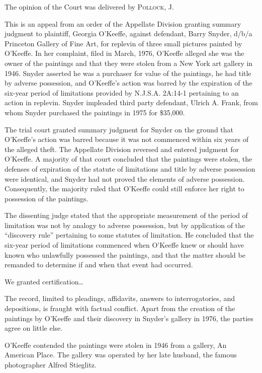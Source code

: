 
\opinion The opinion of the Court was delivered by \textsc{Pollock}, J.

This is an appeal from an order of the Appellate Division granting summary
judgment to plaintiff, Georgia O'Keeffe, against defendant, Barry Snyder, d/b/a
Princeton Gallery of Fine Art, for replevin of three small pictures painted by
O'Keeffe. In her complaint, filed in March, 1976, O'Keeffe alleged she was the
owner of the paintings and that they were stolen from a New York art gallery in
1946. Snyder asserted he was a purchaser for value of the paintings, he had
title by adverse possession, and O'Keeffe's action was barred by the expiration
of the six-year period of limitations provided by N.J.S.A. 2A:14-1 pertaining
to an action in replevin. Snyder impleaded third party defendant, Ulrich A.
Frank, from whom Snyder purchased the paintings in 1975 for \$35,000. 

The trial court granted summary judgment for Snyder on the ground that
O'Keeffe's action was barred because it was not commenced within six years of
the alleged theft. The Appellate Division reversed and entered judgment for
O'Keeffe. A majority of that court concluded that the paintings were stolen,
the defenses of expiration of the statute of limitations and title by adverse
possession were identical, and Snyder had not proved the elements of adverse
possession. Consequently, the majority ruled that O'Keeffe could still enforce
her right to possession of the paintings. 

The dissenting judge stated that the appropriate measurement of the period of
limitation was not by analogy to adverse possession, but by application of the
``discovery rule'' pertaining to some statutes of limitation. He concluded that
the six-year period of limitations commenced when O'Keeffe knew or should have
known who unlawfully possessed the paintings, and that the matter should be
remanded to determine if and when that event had occurred.

We granted certification\ldots


The record, limited to pleadings, affidavits, answers to interrogatories, and
depositions, is fraught with factual conflict. Apart from the creation of the
paintings by O'Keeffe and their discovery in Snyder's gallery in 1976, the
parties agree on little else.

O'Keeffe contended the paintings were stolen in 1946 from a gallery, An American
Place. The gallery was operated by her late husband, the famous photographer
Alfred Stieglitz.

